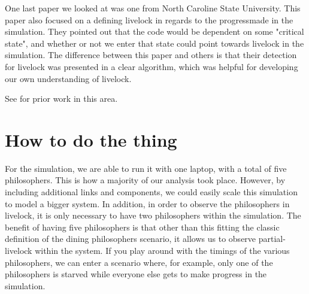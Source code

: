 \documentclass{article}
\begin{document}
One last paper we looked at was one from North Caroline State University.\cite{k.tai}  This paper also focused on a defining livelock in regards to the progressmade in the simulation.  They pointed out that the code would be dependent on some "critical state", and whether or not we enter that state could point towards livelock in the simulation.  The difference between this paper and others is that their detection for livelock was presented in a clear algorithm, which was helpful for developing our own understanding of livelock. \newline

See \cite{texbook} for prior work in this area.

\section{How to do the thing}

For the simulation, we are able to run it with one laptop, with a total of five philosophers.  This is how a 
majority of our analysis took place.  However, by including additional links and components, we could easily 
scale this simulation to model a bigger system.  In addition, in order to observe the philosophers in livelock, it is only necessary to have two philosophers within the simulation.  The benefit of having five philosophers is that other than this fitting the classic definition of the dining philosophers scenario, it allows us to observe partial-livelock within the system.  If you play around with the timings of the various philosophers, we can enter a scenario where, for example, only one of the philosophers is starved while everyone else gets to make progress in the simulation. \newline
\end{document}
